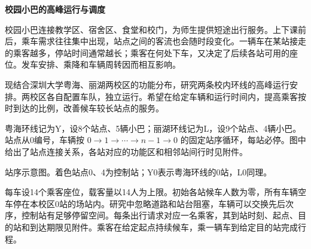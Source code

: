 \documentclass[11pt,a4paper]{article}
\begin{document}
\begin{center}{\LARGE\bfseries 校园小巴的高峰运行与调度}\end{center}

校园小巴连接教学区、宿舍区、食堂和校门，为师生提供短途出行服务。上下课前后，乘车需求往往集中出现，站点之间的客流也会随时段变化。一辆车在某站接走的乘客越多，停站时间通常越长；乘客在何处下车，又决定了后续各站可用的座位。发车安排、乘降和车辆周转因而相互影响。

现结合深圳大学粤海、丽湖两校区的功能分布，研究两条校内环线的高峰运行安排。两校区各自配置车队，独立运行。希望在给定车辆和运行时间内，提高乘客按时到达的比例，改善候车较长站点的服务。

粤海环线记为Y，设8个站点、5辆小巴；丽湖环线记为L，设9个站点、4辆小巴。站点从0编号，车辆按 $0\to1\to\cdots\to n-1\to0$ 的固定站序循环，每站必停。图中给出了站点连接关系，各站对应的功能区和相邻站间行时见附件。

\begin{center}
\begin{minipage}{.48\linewidth}\centering
{}
\end{minipage}\hfill
\begin{minipage}{.48\linewidth}\centering
{}
\end{minipage}

\small 站序示意图。着色站点0、4为控制站；Y0表示粤海环线的0站，L0同理。
\end{center}

每车设14个乘客座位，载客量以14人为上限。初始各站候车人数为零，所有车辆空车停在本校区0站的场站内。研究中忽略道路和站台阻塞，车辆可以交换先后次序，控制站有足够停留空间。每条出行请求对应一名乘客，其到站时刻、起点、目的站和到达期限见附件。乘客在给定起点持续候车，乘一辆车到给定目的站完成行程。
\end{document}
